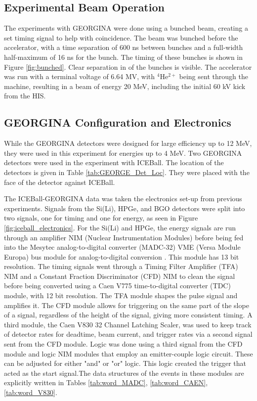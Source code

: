 \subsection{Experimental Beam Operation}

The experiments with GEORGINA were done using a bunched beam, creating a set timing signal to help with coincidence. The beam was bunched before the accelerator, with a time separation of 600 ns between bunches and a full-width half-maximum of 16 ns for the bunch. The timing of these bunches is shown in Figure \ref{fig:bunched}. Clear separation in of the bunches is visible. The accelerator was run with a terminal voltage of 6.64 MV, with $^{4}$He$^{2+}$ being sent through the machine, resulting in a beam of energy 20 MeV, including the initial 60 kV kick from the HIS. 



\subsection{GEORGINA Configuration and Electronics}
\label{sec:GEORGINA_electronics}

While the GEORGINA detectors were designed for large efficiency up to 12 MeV, they were used in this experiment for energies up to 4 MeV. Two GEORGINA detectors were used in the experiment with ICEBall. The location of the detectors is given in Table \ref{tab:GEORGE_Det_Loc}. They were placed with the face of the detector against ICEBall.



The ICEBall-GEORGINA data was taken the electronics set-up from previous experiments\citep{battaglia15:_iceball_176lu}. Signals from the Si(Li), HPGe, and BGO detectors were split into two signals, one for timing and one for energy, as seen in Figure \ref{fig:iceball_electronics}. For the Si(Li) and HPGe, the energy signals are run through an amplifier NIM (Nuclear Instrumentation Modules) before being fed into the Mesytec analog-to-digital converter (MADC-32) VME (Versa Module Europa) bus module for analog-to-digital conversion \citep{mesytec:_ADC}. This module has 13 bit resolution. The timing signals went through a Timing Filter Amplifier (TFA) NIM and a Constant Fraction Discriminator (CFD) NIM to clean the signal before being converted using a Caen V775 time-to-digital converter (TDC) module, with 12 bit resolution\citep{caen:_TDC}. The TFA module shapes the pulse signal and amplifies it. The CFD module allows for triggering on the same part of the slope of a signal, regardless of the height of the signal, giving more consistent timing. A third module, the Caen V830 32 Channel Latching Scaler, was used to keep track of detector rates for deadtime, beam current, and trigger rates\citep{caen:_scaler} via a second signal sent from the CFD module. Logic was done using a third signal from the CFD module and logic NIM modules that employ an emitter-couple logic circuit. These can be adjusted for either "and" or "or" logic. This logic created the trigger that acted as the start signal.The data structures of the events in these modules are explicitly written in Tables \ref{tab:word_MADC}, \ref{tab:word_CAEN}, \ref{tab:word_V830}.

